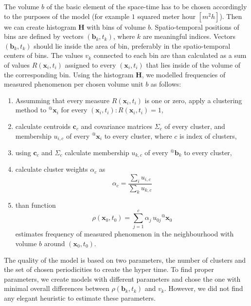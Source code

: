 The volume $b$ of the basic element of the space-time has to be chosen accordingly to the purposes of the model (for example $1$ squared meter hour $[m^{2}h]$). 
Then we can create histogram $\mathbf{H}$ with bins of volume $b$.
Spatio-temporal positions of bins are defined by vectors $\left(\mathbf{b}_{k}, t_{k}\right)$, where $k$ are meaningful indices.
Vectors $\left(\mathbf{b}_{k}, t_{k}\right)$ should lie inside the area of bin, preferably in the spatio-temporal centers of bins.
The values $v_{k}$ connected to each bin are than calculated as a sum of values $R\left(\mathbf{x}_i, t_i\right)$ assigned to every $\left(\mathbf{x}_i, t_i\right)$ that lies inside of the volume of the corresponding bin.
Using the histogram $\mathbf{H}$, we modelled frequencies of measured phenomenon per chosen volume unit $b$ as follows:
\begin{enumerate}
    \item Assumming that every measure $R\left(\mathbf{x}_i, t_i\right)$ is one or zero,  apply a clustering method to ${}^{@}\mathbf{x}_{i}$ for every $\left(\mathbf{x}_i, t_i\right) : R\left(\mathbf{x}_i, t_i\right) = 1 $,
    \item calculate centroids $\mathbf{c}_c$ and covariance matrices $\Sigma_{c}$ of every cluster, and membership $u_{i, c}$ of every ${}^{@}\mathbf{x}_{i}$ to every cluster, where $c$ is index of clusters,
    \item using $\mathbf{c}_c$ and $\Sigma_{c}$ calculate membership $u_{k, c}$ of every ${}^{@}\mathbf{b}_{k}$ to every cluster,
    \item calculate cluster weights $\alpha_{c}$ as
\begin{equation}
    \alpha_{c} = \frac{\sum_{i}u_{i, c}}{\sum_{k}u_{k, c}}
\end{equation}
    \item than function
\begin{equation}\label{eqn:distribution}
    \rho\left(\mathbf{x}_{0},t_{0}\right) = \sum_{j=1}^{c}{\alpha_j\,u_{0j}{}^{@}\mathbf{x}_{0}}
\end{equation}
estimates frequency of measured phenomenon in the neighbourhood with volume $b$ around $\left(\mathbf{x}_0, t_0\right)$.
\end{enumerate}
%
The quality of the model is based on two parameters, the number of clusters and the set of chosen periodicities to create the hyper time.
To find proper parameters, we create models with different parameters and chose the one with minimal overall differences between $\rho\left(\mathbf{b}_{k},t_{k}\right)$ and $v_{k}$.
However, we did not find any elegant heuristic to estimate these parameters.

